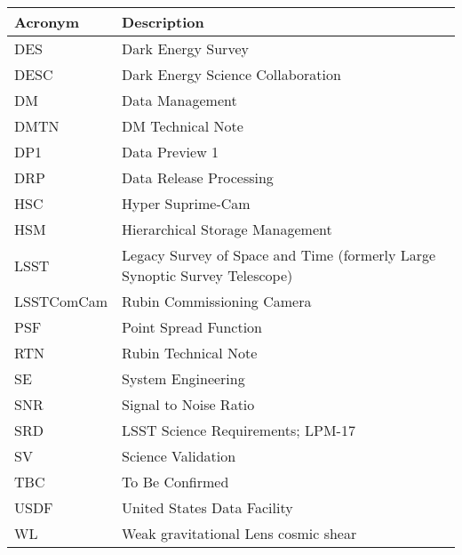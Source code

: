 \addtocounter{table}{-1}
\begin{longtable}{p{}p{}}\hline
\textbf{Acronym} & \textbf{Description}  \\\hline

DES & Dark Energy Survey \\\hline
DESC & Dark Energy Science Collaboration \\\hline
DM & Data Management \\\hline
DMTN & DM Technical Note \\\hline
DP1 & Data Preview 1 \\\hline
DRP & Data Release Processing \\\hline
HSC & Hyper Suprime-Cam \\\hline
HSM & Hierarchical Storage Management \\\hline
LSST & Legacy Survey of Space and Time (formerly Large Synoptic Survey Telescope) \\\hline
LSSTComCam & Rubin Commissioning Camera \\\hline
PSF & Point Spread Function \\\hline
RTN & Rubin Technical Note \\\hline
SE & System Engineering \\\hline
SNR & Signal to Noise Ratio \\\hline
SRD & LSST Science Requirements; LPM-17 \\\hline
SV & Science Validation \\\hline
TBC & To Be Confirmed \\\hline
USDF & United States Data Facility \\\hline
WL & Weak gravitational Lens cosmic shear \\\hline
\end{longtable}
